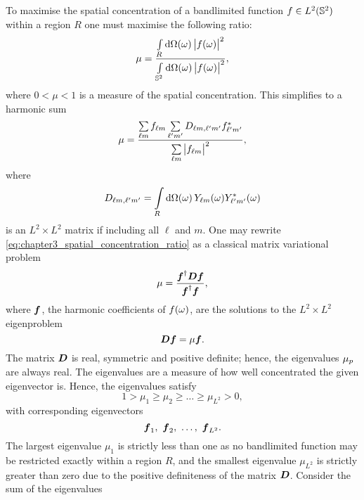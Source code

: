 To maximise the spatial concentration of a bandlimited function \(f \in \hilbert{\twoSphere}\) within a region \(R\) one must maximise the following ratio:
%
\begin{equation}
	\mu
	= \frac{\integrateRegion{\omega} \abs{\pixel{f}}^{2}}{\integrateSphere{\omega} \abs{\pixel{f}}^{2}},
\end{equation}
%
where \(0 < \mu < 1\) is a measure of the spatial concentration.
This simplifies to a harmonic sum
%
\begin{equation}\label{eq:chapter3_spatial_concentration_ratio}
	\mu
	= \frac{\harmonicSum \harmonic{f} \harmonicSum['] \Dmatrix \conj{\harmonic[']{f}}}{\harmonicSum \abs{\harmonic{f}}^{2}},
\end{equation}
%
where
%
\begin{equation}
	\Dmatrix
	= \integrateRegion{\omega} \pixel{\harmonic{Y}} \pixel{\conj{\harmonic[']{Y}}}
\end{equation}
%
is an \(L^{2} \times{} L^{2}\) matrix if including all \(\ell{}\) and \(m\).
One may rewrite \cref{eq:chapter3_spatial_concentration_ratio} as a classical matrix variational problem
%
\begin{equation}
	\mu
	= \frac{\vb*{f}^{\dagger} \vb*{D} \vb*{f}}{\vb*{f}^{\dagger}\vb*{f}},
\end{equation}
%
where \(\vb*{f}\), the harmonic coefficients of \(\pixel{f}\), are the solutions to the \(L^{2} \times{} L^{2}\) eigenproblem
%
\begin{equation}\label{eq:chapter3_eigenproblem}
	\vb*{D}\vb*{f}
	= \mu\vb*{f}.
\end{equation}
%
The matrix \(\vb*{D}\) is real, symmetric and positive definite; hence, the eigenvalues \(\slepian{\mu}\) are always real.
The eigenvalues are a measure of how well concentrated the given eigenvector is.
Hence, the eigenvalues satisfy
%
\begin{equation}
	1 > \mu_{1} \geq \mu_{2} \geq \ldots \geq \mu_{L^{2}} > 0, %
\end{equation}
%
with corresponding eigenvectors
%
\begin{equation}
	\vb*{f}_{1},\ \vb*{f}_{2},\ \ldots,\ \vb*{f}_{L^{2}}.
\end{equation}
%
The largest eigenvalue \(\mu_{1}\) is strictly less than one as no bandlimited function may be restricted exactly within a region \(R\), and the smallest eigenvalue \(\mu_{L^{2}}\) is strictly greater than zero due to the positive definiteness of the matrix \(\vb*{D}\).
Consider the sum of the eigenvalues
